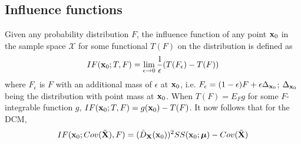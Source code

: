 \documentclass[fleqn,11pt]{article}
\begin{document}
\subsection{Influence functions}
Given any probability distribution $F$, the influence function of any point ${\bf{x}}_0$ in the sample space $\mathcal{X}$ for some functional $T(F)$ on the distribution is defined as
%
$$ IF({\bf{x}}_0; T,F) = \lim_{\epsilon \rightarrow 0} \frac{1}{\epsilon} (T(F_\epsilon) - T(F)) $$
%
where $F_\epsilon$ is $F$ with an additional mass of $\epsilon$ at ${\bf{x}}_0$, i.e. $F_\epsilon = (1-\epsilon)F + \epsilon \Delta_{{\bf{x}}_0}$; $\Delta_{{\bf{x}}_0}$ being the distribution with point mass at ${\bf{x}}_0$. When $T(F) = E_F g$ for some $F$-integrable function $g$, $IF({\bf{x}}_0; T,F) = g({\bf{x}}_0) - T(F)$. It now follows that for the DCM,
%
$$ IF({\bf{x}}_0; Cov(\tilde {{\mathbf{X}}}), F) = (\tilde D_{\mathbf{X}}({\bf{x}}_0))^2 SS({\bf{x}}_0; {\boldsymbol{\mu}}) - Cov(\tilde {{\mathbf{X}}}) $$
\end{document}
